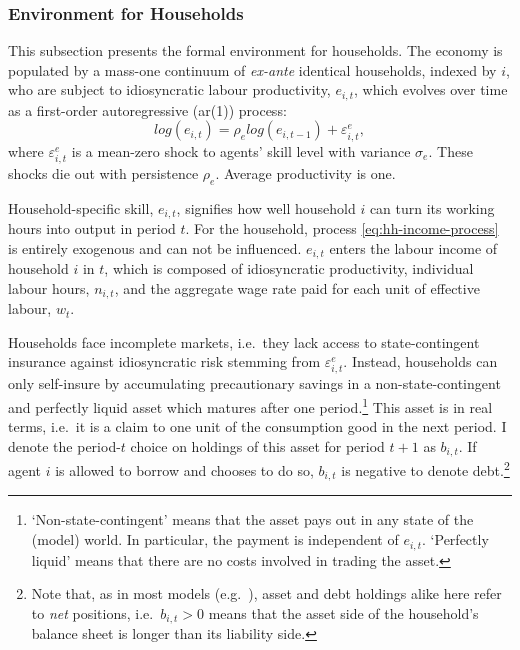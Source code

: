 \documentclass[a4paper,12pt]{article} %
\numberwithin{equation}{section} %
\numberwithin{figure}{section}
\numberwithin{table}{section}
\begin{document}
\subsubsection{Environment for Households}
\label{sec:model-hh-environment}

This subsection presents the formal environment for households. The economy is populated by a mass-one continuum of \textit{ex-ante} identical households, indexed by $i$, who are subject to idiosyncratic labour productivity, $e_{i,t}$, which evolves over time as a first-order autoregressive (\Gls{ar}(1)) process:
\begin{equation}
    log(e_{i,t}) = \rho_e log(e_{i,t-1}) + \varepsilon^e_{i,t}, \label{eq:hh-income-process}
\end{equation}
where $\varepsilon^e_{i,t}$ is a mean-zero shock to agents' skill level with variance $\sigma_e$. These shocks die out with persistence $\rho_e$. Average productivity is one.

Household-specific skill, $e_{i,t}$, signifies how well household $i$ can turn its working hours into output in period $t$. For the household, process \eqref{eq:hh-income-process} is entirely exogenous and can not be influenced. $e_{i,t}$ enters the labour income of household $i$ in $t$, which is composed of idiosyncratic productivity, individual labour hours, $n_{i,t}$, and the aggregate wage rate paid for each unit of effective labour, $w_t$.

Households face incomplete markets, i.e.~they lack access to state-contingent insurance against idiosyncratic risk stemming from $\varepsilon^e_{i,t}$. Instead, households can only self-insure by accumulating precautionary savings in a non-state-contingent and perfectly liquid asset which matures after one period.\footnote{`Non-state-contingent' means that the asset pays out in any state of the (model) world. In particular, the payment is independent of $e_{i,t}$. `Perfectly liquid' means that there are no costs involved in trading the asset.} This asset is in real terms, i.e.~it is a claim to one unit of the consumption good in the next period. I denote the period-$t$ choice on holdings of this asset for period $t+1$ as $b_{i,t}$. If agent $i$ is allowed to borrow and chooses to do so, $b_{i,t}$ is negative to denote debt.\footnote{Note that, as in most models (e.g.~\cite{kaplan2018}), asset and debt holdings alike here refer to \textit{net} positions, i.e.~$b_{i,t} > 0$ means that the asset side of the household's balance sheet is longer than its liability side.}
\end{document}
